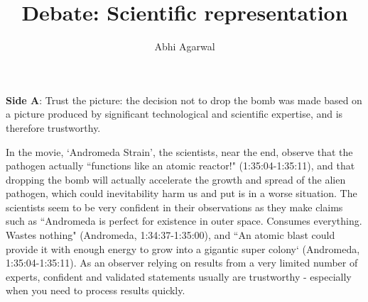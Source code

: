 \documentclass[11pt, oneside]{article}
\title{Debate: Scientific representation\vspace{-0.4cm}}
\author{Abhi Agarwal\vspace{-1cm}}
\date{}
\begin{document}
\maketitle

\noindent \textbf{Side A}: Trust the picture: the decision not to drop the bomb was made based on a picture produced by significant technological and scientific expertise, and is therefore trustworthy.



\par In the movie, `Andromeda Strain', the scientists, near the end, observe that the pathogen actually ``functions like an atomic reactor!" (1:35:04-1:35:11), and that dropping the bomb will actually accelerate the growth and spread of the alien pathogen, which could inevitability harm us and put is in a worse situation. The scientists seem to be very confident in their observations as they make claims such as ``Andromeda is perfect for existence in outer space. Consumes everything. Wastes nothing" (Andromeda, 1:34:37-1:35:00), and ``An atomic blast could provide it with enough energy to grow into a gigantic super colony` (Andromeda, 1:35:04-1:35:11). As an observer relying on results from a very limited number of experts, confident and validated statements usually are trustworthy - especially when you need to process results quickly.
\end{document}
